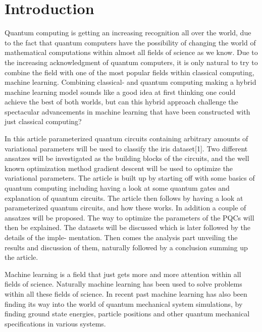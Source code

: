 \documentclass[../main.tex]{subfiles}
\begin{document}
\chapter{Introduction}
\label{sec:intro}

Quantum computing is getting an increasing recognition all over the world, due to the fact that quantum computers have the possibility of changing the world of mathematical computations within almost all fields of science as we know. Due to the increasing acknowledgment of quantum computers, it is only natural to try to combine the field with one of the most popular fields within classical computing, machine learning.
Combining classical- and quantum computing making a hybrid machine learning model sounds like a good idea at first thinking one could achieve the best of both worlds, but can this hybrid approach challenge the spectacular advancements in machine learning that have been constructed with just classical computing?




In this article parameterized quantum circuits containing arbitrary amounts of variational parameters will be used to classify the iris dataset[1]. Two different ansatzes will be investigated as the building blocks of the circuits, and the well known optimization method gradient descent will be used to optimize the variational parameters.
The article is built up by starting off with some basics of quantum computing including having a look at some quantum gates and explanation of quantum circuits. The article then follows by having a look at parameterized quantum circuits, and how these works. In addition a couple of ansatzes will be proposed. The way to optimize the parameters of the PQCs will then be explained. The datasets will be discussed which is later followed by the details of the imple- mentation. Then comes the analysis part unveiling the results and discussion of them, naturally followed by a conclusion summing up the article.


Machine learning is a field that just gets more and more attention within all fields of science. Naturally machine learning has been used to solve problems within all these fields of science. In recent past machine learning has also been finding its way into the world of quantum mechanical system simulations, by finding ground state energies, particle positions and other quantum mechanical specifications in various systems.
\end{document}
